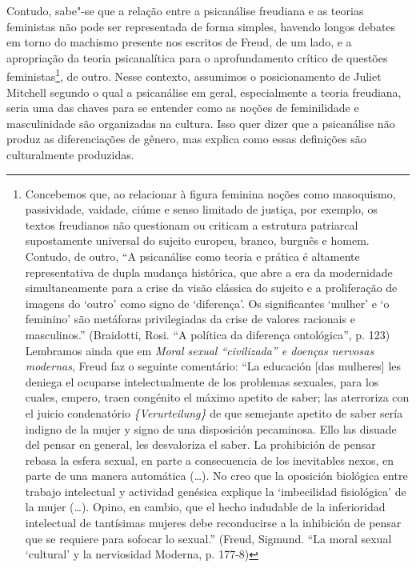 Contudo, sabe"-se que a relação entre a psicanálise freudiana e as
teorias feministas não pode ser representada de forma simples, havendo
longos debates em torno do machismo presente nos escritos de Freud, de
um lado, e a apropriação da teoria psicanalítica para o aprofundamento
crítico de questões feministas\footnote{Concebemos que, ao relacionar à
  figura feminina noções como masoquismo, passividade, vaidade, ciúme e
  senso limitado de justiça, por exemplo, os textos freudianos não
  questionam ou criticam a estrutura patriarcal supostamente universal
  do sujeito europeu, branco, burguês e homem. Contudo, de outro, ``A
  psicanálise como teoria e prática é altamente representativa de dupla
  mudança histórica, que abre a era da modernidade simultaneamente para
  a crise da visão clássica do sujeito e a proliferação de imagens do
  `outro' como signo de `diferença'. Os significantes `mulher' e `o
  feminino' são metáforas privilegiadas da crise de valores racionais e
  masculinos.'' (Braidotti, Rosi. ``A política da diferença
  ontológica'', p. 123) Lembramos ainda que em \emph{Moral sexual
  ``civilizada'' e doenças nervosas modernas}, Freud faz o seguinte
  comentário: ``La educación {[}das mulheres{]} les deniega el ocuparse
  intelectualmente de los problemas sexuales, para los cuales, empero,
  traen congénito el máximo apetito de saber; las aterroriza con el
  juicio condenatório \emph{\{Verurteilung\}} de que semejante apetito
  de saber sería indigno de la mujer y signo de una disposición
  pecaminosa. Ello las disuade del pensar en general, les desvaloriza el
  saber. La prohibición de pensar rebasa la esfera sexual, en parte a
  consecuencia de los inevitables nexos, en parte de una manera
  automática (\ldots{}). No creo que la oposición biológica entre trabajo
  intelectual y actividad genésica explique la `imbecilidad fisiológica'
  de la mujer (\ldots{}). Opino, en cambio, que el hecho indudable de la
  inferioridad intelectual de tantísimas mujeres debe reconducirse a la
  inhibición de pensar que se requiere para sofocar lo sexual.'' (Freud,
  Sigmund. ``La moral sexual `cultural' y la nerviosidad Moderna, p.
  177-8)}, de outro. Nesse contexto, assumimos o posicionamento de
Juliet Mitchell segundo o qual a psicanálise em geral, especialmente a
teoria freudiana, seria uma das chaves para se entender como as noções
de feminilidade e masculinidade são organizadas na cultura. Isso quer
dizer que a psicanálise não produz as diferenciações de gênero, mas
explica como essas definições são culturalmente produzidas.

